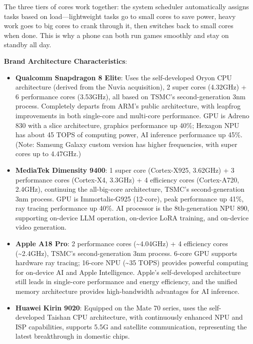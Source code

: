 The three tiers of cores work together: the system scheduler automatically assigns tasks based on load—lightweight tasks go to small cores to save power, heavy work goes to big cores to crank through it, then switches back to small cores when done. This is why a phone can both run games smoothly and stay on standby all day.

\textbf{Brand Architecture Characteristics}:

\begin{itemize}
  \item \textbf{Qualcomm Snapdragon 8 Elite}: Uses the self-developed Oryon CPU architecture (derived from the Nuvia acquisition), 2 super cores (4.32GHz) + 6 performance cores (3.53GHz), all based on TSMC's second-generation 3nm process. Completely departs from ARM's public architecture, with leapfrog improvements in both single-core and multi-core performance. GPU is Adreno 830 with a slice architecture, graphics performance up 40\%; Hexagon NPU has about 45 TOPS of computing power, AI inference performance up 45\%. (Note: Samsung Galaxy custom version has higher frequencies, with super cores up to 4.47GHz.)
  \item \textbf{MediaTek Dimensity 9400}: 1 super core (Cortex-X925, 3.62GHz) + 3 performance cores (Cortex-X4, 3.3GHz) + 4 efficiency cores (Cortex-A720, 2.4GHz), continuing the all-big-core architecture, TSMC's second-generation 3nm process. GPU is Immortalis-G925 (12-core), peak performance up 41\%, ray tracing performance up 40\%. AI processor is the 8th-generation NPU 890, supporting on-device LLM operation, on-device LoRA training, and on-device video generation.
  \item \textbf{Apple A18 Pro}: 2 performance cores (\textasciitilde{}4.04GHz) + 4 efficiency cores (\textasciitilde{}2.4GHz), TSMC's second-generation 3nm process. 6-core GPU supports hardware ray tracing; 16-core NPU (\textasciitilde{}35 TOPS) provides powerful computing for on-device AI and Apple Intelligence. Apple's self-developed architecture still leads in single-core performance and energy efficiency, and the unified memory architecture provides high-bandwidth advantages for AI inference.
  \item \textbf{Huawei Kirin 9020}: Equipped on the Mate 70 series, uses the self-developed Taishan CPU architecture, with continuously enhanced NPU and ISP capabilities, supports 5.5G and satellite communication, representing the latest breakthrough in domestic chips.
\end{itemize}

